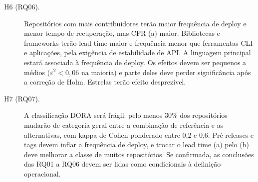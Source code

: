 \begin{description}
  \item[H6 (RQ06).] Repositórios com mais contribuidores terão maior frequência de
  deploy e menor tempo de recuperação, mas CFR (a) maior. Bibliotecas e
  frameworks terão lead time maior e frequência menor que ferramentas CLI e
  aplicações, pela exigência de estabilidade de API. A linguagem principal estará
  associada à frequência de deploy. Os efeitos devem ser pequenos a médios
  ($\varepsilon^2<0{,}06$ na maioria) e parte deles deve perder significância
  após a correção de Holm. Estrelas terão efeito desprezível.

  \item[H7 (RQ07).] A classificação DORA será frágil: pelo menos 30\% dos
  repositórios mudarão de categoria geral entre a combinação de referência e as
  alternativas, com kappa de Cohen ponderado entre 0,2 e 0,6. Pré-releases e
  tags devem inflar a frequência de deploy, e trocar o lead time (a) pelo (b)
  deve melhorar a classe de muitos repositórios. Se confirmada, as conclusões
  das RQ01 a RQ06 devem ser lidas como condicionais à definição operacional.
\end{description}
